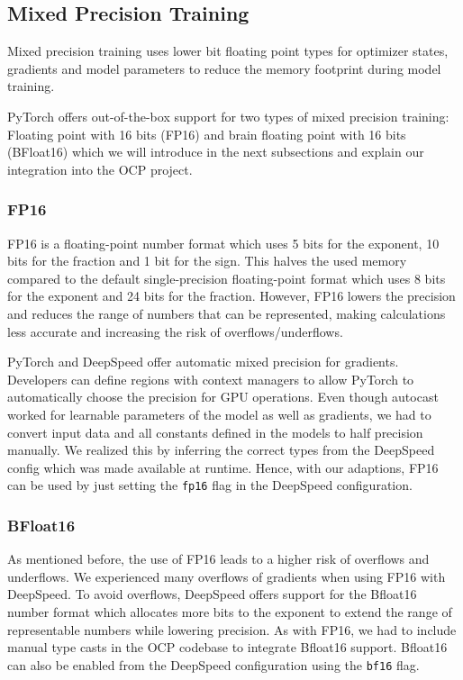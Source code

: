 \subsection{Mixed Precision Training}
\label{subsection:mixedprecision}

Mixed precision training uses lower bit floating point types for optimizer states, gradients and model parameters to 
reduce the memory footprint during model training. 

PyTorch offers out-of-the-box support for two types of mixed precision training: Floating point with 16 bits (FP16) and 
brain floating point with 16 bits (BFloat16) which we will introduce in the next subsections and explain our integration 
into the OCP project.

\subsubsection{FP16}

FP16 is a floating-point number format which uses 5 bits for the exponent, 10 bits for the fraction and 1 bit for the 
sign. This halves the used memory compared to the default single-precision floating-point format which uses 8 bits 
for the exponent and 24 bits for the fraction. However, FP16 lowers the precision and reduces the range of numbers 
that can be represented, making calculations less accurate and increasing the risk of overflows/underflows.

PyTorch and DeepSpeed offer automatic mixed precision for gradients. Developers can define regions with context managers 
to allow PyTorch to automatically choose the precision for GPU operations. Even though autocast worked for learnable
parameters of the model as well as gradients, we had to convert input data and all constants defined in the models to half
precision manually. We realized this by inferring the correct types from the DeepSpeed config which was made available 
at runtime. Hence, with our adaptions, 
FP16 can be used by just setting the \texttt{fp16} flag in the DeepSpeed configuration.

\subsubsection{BFloat16}

As mentioned before, the use of FP16 leads to a higher risk of overflows and underflows. We experienced many overflows 
of gradients when using FP16 with DeepSpeed. To avoid overflows, DeepSpeed offers support for the Bfloat16 number 
format which allocates more bits to the exponent to extend the range of representable numbers while lowering 
precision.
As with FP16, we had to include manual type casts in the OCP codebase to integrate Bfloat16 support. 
Bfloat16 can also be enabled from the DeepSpeed configuration using the \texttt{bf16} flag.



